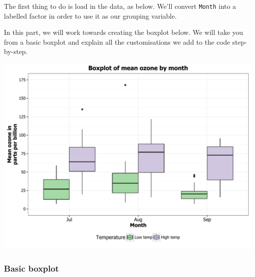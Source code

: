 \documentclass[]{article}
\newenvironment{Shaded}{\begin{snugshade}}{\end{snugshade}}
\newcommand{\KeywordTok}[1]{\textcolor[rgb]{0.13,0.29,0.53}{\textbf{{#1}}}}
\newcommand{\DataTypeTok}[1]{\textcolor[rgb]{0.13,0.29,0.53}{{#1}}}
\newcommand{\StringTok}[1]{\textcolor[rgb]{0.31,0.60,0.02}{{#1}}}
\newcommand{\NormalTok}[1]{{#1}}
\begin{document}
The first thing to do is load in the data, as below. We'll convert
\texttt{Month} into a labelled factor in order to use it as our grouping
variable.

\begin{Shaded}
\end{Shaded}

In this part, we will work towards creating the boxplot below. We will
take you from a basic boxplot and explain all the customisations we add
to the code step-by-step.

\begin{center}\includegraphics{0_all_posts_pdf/box_final-1} \end{center}

\subsubsection{Basic boxplot}\label{basic-boxplot}
\end{document}
